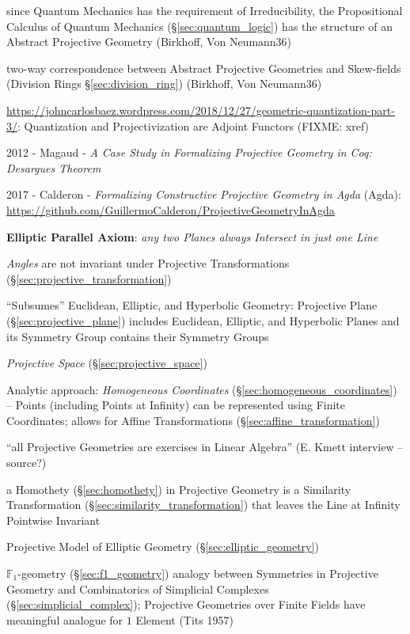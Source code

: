 since Quantum Mechanics has the requirement of Irreducibility, the Propositional
Calculus of Quantum Mechanics (\S\ref{sec:quantum_logic}) has the structure of
an Abstract Projective Geometry (Birkhoff, Von Neumann36)

two-way correspondence between Abstract Projective Geometries and Skew-fields
(Division Rings \S\ref{sec:division_ring}) (Birkhoff, Von Neumann36)

\url{https://johncarlosbaez.wordpress.com/2018/12/27/geometric-quantization-part-3/}:
Quantization and Projectivization are Adjoint Functors (FIXME: xref)

2012 - Magaud - \emph{A Case Study in Formalizing Projective Geometry in Coq:
Desargues Theorem}

2017 - Calderon - \emph{Formalizing Constructive Projective Geometry in Agda}
(Agda): \url{https://github.com/GuillermoCalderon/ProjectiveGeometryInAgda}

\textbf{Elliptic Parallel Axiom}: \emph{any two Planes always Intersect in just
  one Line}

\emph{Angles} are not invariant under Projective Transformations
(\S\ref{sec:projective_transformation})

``Subsumes'' Euclidean, Elliptic, and Hyperbolic Geometry: Projective
Plane (\S\ref{sec:projective_plane}) includes Euclidean, Elliptic, and
Hyperbolic Planes and its Symmetry Group contains their Symmetry
Groups

\emph{Projective Space} (\S\ref{sec:projective_space})

Analytic approach: \emph{Homogeneous Coordinates}
(\S\ref{sec:homogeneous_coordinates}) -- Points (including Points at Infinity)
can be represented using Finite Coordinates; allows for Affine Transformations
(\S\ref{sec:affine_transformation}) %

``all Projective Geometries are exercises in Linear Algebra'' (E.
Kmett interview -- source?) %

a Homothety (\S\ref{sec:homothety}) in Projective Geometry is a Similarity
Transformation (\S\ref{sec:similarity_transformation}) that leaves the Line at
Infinity Pointwise Invariant

Projective Model of Elliptic Geometry (\S\ref{sec:elliptic_geometry})

\fist $\mathbb{F}_1$-geometry (\S\ref{sec:f1_geometry}) analogy between
Symmetries in Projective Geometry and Combinatorics of Simplicial Complexes
(\S\ref{sec:simplicial_complex}); Projective Geometries over Finite Fields have
meaningful analogue for $1$ Element (Tits 1957)

